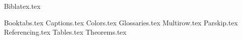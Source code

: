 {Biblatex.tex}
\usepackage[letterpaper, margin=2cm,includefoot,footskip=30pt]{geometry}
\usepackage[spanish, english]{babel}
\usepackage{amsmath}
\usepackage{amssymb}
\usepackage{csquotes}
\usepackage{expl3}
\usepackage{fontspec}
\usepackage{graphicx}
\usepackage{keyval}
\usepackage{url}
\usepackage{xparse}
\usepackage{blindtext}
\usepackage{datetime2}
\usepackage{float}
\usepackage{algorithm}
\usepackage{algpseudocode}
\usepackage{kbordermatrix}
{Booktabs.tex}
{Captions.tex}
{Colors.tex}
{Glossaries.tex}
{Multirow.tex}
{Parskip.tex}
{Referencing.tex}
{Tables.tex}
{Theorems.tex}